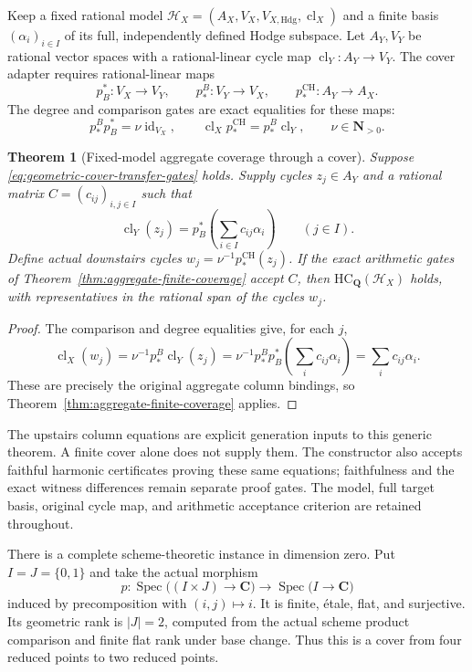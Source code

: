 \documentclass[11pt]{article}
\newtheorem{theorem}{Theorem}[section]
\theoremstyle{definition}
\theoremstyle{remark}
\DeclareMathOperator{\Spec}{Spec}
\DeclareMathOperator{\CH}{CH}
\newcommand{\Q}{\mathbf Q}
\begin{document}
Keep a fixed rational model
\(\mathscr H_X=(A_X,V_X,V_{X,\mathrm{Hdg}},\operatorname{cl}_X)\)
and a finite basis \((\alpha_i)_{i\in I}\) of its full, independently defined
Hodge subspace. Let \(A_Y,V_Y\) be rational vector spaces with a rational-linear cycle map
\(\operatorname{cl}_Y:A_Y\to V_Y\). The cover adapter requires
rational-linear maps
\[
 p_B^*:V_X\longrightarrow V_Y,\qquad
 p_*^B:V_Y\longrightarrow V_X,\qquad
 p_*^{\CH}:A_Y\longrightarrow A_X.
\]
The degree and comparison gates are exact equalities for these maps:
\begin{equation}\label{eq:geometric-cover-transfer-gates}
 p_*^B p_B^*=\nu\operatorname{id}_{V_X},\qquad
 \operatorname{cl}_X p_*^{\CH}=p_*^B\operatorname{cl}_Y,
 \qquad \nu\in\mathbf N_{>0}.
\end{equation}

\begin{theorem}[Fixed-model aggregate coverage through a cover]
\label{thm:geometric-cover-aggregate}
Suppose \eqref{eq:geometric-cover-transfer-gates} holds. Supply cycles
\(z_j\in A_Y\) and a rational matrix \(C=(c_{ij})_{i,j\in I}\) such that
\[
 \operatorname{cl}_Y(z_j)
   =p_B^*\!\left(\sum_{i\in I}c_{ij}\alpha_i\right)
 \qquad(j\in I).
\]
Define actual downstairs cycles
\(w_j=\nu^{-1}p_*^{\CH}(z_j)\).
If the exact arithmetic gates of
Theorem~\ref{thm:aggregate-finite-coverage} accept \(C\), then
\(\mathrm{HC}_{\Q}(\mathscr H_X)\) holds, with representatives in the
rational span of the cycles \(w_j\).
\end{theorem}
\begin{proof}
The comparison and degree equalities give, for each \(j\),
\[
 \operatorname{cl}_X(w_j)
 =\nu^{-1}p_*^B\operatorname{cl}_Y(z_j)
 =\nu^{-1}p_*^B p_B^*\!\left(\sum_i c_{ij}\alpha_i\right)
 =\sum_i c_{ij}\alpha_i.
\]
These are precisely the original aggregate column bindings, so
Theorem~\ref{thm:aggregate-finite-coverage} applies.
\end{proof}

The upstairs column equations are explicit generation inputs to this
generic theorem. A finite cover alone does not supply them. The constructor
also accepts faithful harmonic certificates proving these same equations;
faithfulness and the exact witness differences remain separate proof gates.
The model, full target basis, original cycle map, and arithmetic acceptance
criterion are retained throughout.

There is a complete scheme-theoretic instance in dimension zero. Put
\(I=J=\{0,1\}\) and take the actual morphism
\[
 p:\Spec\bigl((I\times J)\to\mathbf C\bigr)
       \longrightarrow\Spec\bigl(I\to\mathbf C\bigr)
\]
induced by precomposition with \((i,j)\mapsto i\). It is finite,
\'{e}tale, flat, and surjective. Its geometric rank is \(|J|=2\),
computed from the actual scheme product comparison and finite flat
rank under base change. Thus this is a cover from four reduced points
to two reduced points.
\end{document}
